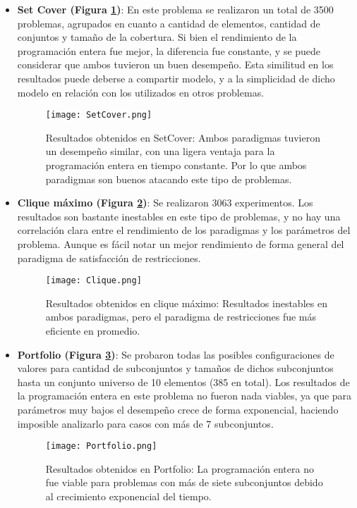 \documentclass[12pt]{report}
\begin{document}
\begin{itemize}
\newpage

    \item \textbf{Set Cover (Figura \ref{fig:SetCover})}: En este problema se realizaron un total de 3500 problemas, agrupados en cuanto a cantidad de elementos, cantidad de conjuntos y tamaño de la cobertura. Si bien el rendimiento de la programación entera fue mejor, la diferencia fue constante, y se puede considerar que ambos tuvieron un buen desempeño. Esta similitud en los resultados puede deberse a compartir modelo, y a la simplicidad de dicho modelo en relación con los utilizados en otros problemas.
    
    \begin{figure}[ht]
    \centering
    \texttt{[image: SetCover.png]}
    \caption{Resultados obtenidos en SetCover: Ambos paradigmas tuvieron un desempeño similar, con una ligera ventaja para la programación entera en tiempo constante. Por lo que ambos paradigmas son buenos atacando este tipo de problemas.}
    \label{fig:SetCover}
    \end{figure}

\newpage

    \item \textbf{Clique máximo (Figura \ref{fig:Clique})}: Se realizaron 3063 experimentos. Los resultados son bastante inestables en este tipo de problemas, y no hay una correlación clara entre el rendimiento de los paradigmas y los parámetros del problema. Aunque es fácil notar un mejor rendimiento de forma general del paradigma de satisfacción de restricciones. 
    \begin{figure}[ht]
    \centering
    \texttt{[image: Clique.png]}
    \caption{Resultados obtenidos en clique máximo: Resultados inestables en ambos paradigmas, pero el paradigma de restricciones fue más eficiente en promedio.}
    \label{fig:Clique}
    \end{figure}

\newpage

    \item \textbf{Portfolio (Figura \ref{fig:Portfolio})}: Se probaron todas las posibles configuraciones de valores para  cantidad de subconjuntos y tamaños de dichos subconjuntos hasta un conjunto universo de 10 elementos (385 en total). Los resultados de la programación entera en este problema no fueron nada viables, ya que para parámetros muy bajos el desempeño crece de forma exponencial, haciendo imposible analizarlo para casos con más de 7 subconjuntos.
    \begin{figure}[ht]
    \centering
    \texttt{[image: Portfolio.png]}
    \caption{Resultados obtenidos en Portfolio: La programación entera no fue viable para problemas con más de siete subconjuntos debido al crecimiento exponencial del tiempo.}
    \label{fig:Portfolio}
    \end{figure}


\end{itemize}
\end{document}
